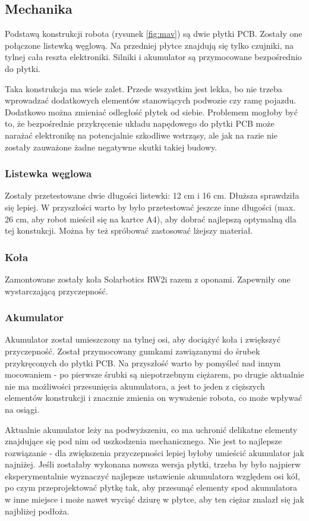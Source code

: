 \documentclass[12pt,a4paper]{article}
\begin{document}
\subsection{Mechanika}
Podstawą konstrukcji robota (rysunek \ref{fig:mav}) są dwie płytki PCB. 
Zostały one połączone listewką węglową. Na przedniej płytce znajdują się tylko czujniki, na tylnej cała reszta elektroniki. Silniki i akumulator są przymocowane bezpośrednio do płytki.

Taka konstrukcja ma wiele zalet. Przede wszystkim jest lekka, bo nie trzeba wprowadzać dodatkowych elementów stanowiących podwozie czy ramę pojazdu. Dodatkowo można zmieniać odległość płytek od siebie. Problemem mogłoby być to, że bezpośrednie przykręcenie układu napędowego do płytki PCB może narażać elektronikę na potencjalnie szkodliwe wstrząsy, ale jak na razie nie zostały zauważone żadne negatywne skutki takiej budowy.


\subsubsection{Listewka węglowa}
Zostały przetestowane dwie długości listewki: 12 cm i 16 cm. Dłuższa sprawdziła się lepiej. W przyszłości warto by było przetestować jeszcze inne długości (max. 26 cm, aby robot mieścił się na kartce A4), aby dobrać najlepszą optymalną dla tej konstukcji. Można by też spróbować zastosować lżejszy materiał.


\subsubsection{Koła}
Zamontowane zostały koła Solarbotics RW2i razem z oponami. Zapewniły one wystarczającą przyczepność.

\subsubsection{Akumulator}
Akumulator został umieszczony na tylnej osi, aby dociążyć koła i zwiększyć przyczepność. Został przymocowany gumkami zawiązanymi do śrubek przykręconych do płytki PCB. Na przyszłość warto by pomyśleć nad innym mocowaniem - po pierwsze śrubki są niepotrzebnym ciężarem, po drugie aktualnie nie ma możliwości przesunięcia akumulatora, a jest to jeden z cięższych elementów konstrukcji i znacznie zmienia on wyważenie robota, co może wpływać na osiągi.

Aktualnie akumulator leży na podwyższeniu, co ma uchronić delikatne elementy znajdujące się pod nim od uszkodzenia mechanicznego. Nie jest to najlepsze rozwiązanie - dla zwiększenia przyczepności lepiej byłoby umieścić akumulator jak najniżej. Jeśli zostałaby wykonana nowsza wersja płytki, trzeba by było najpierw eksperymentalnie wyznaczyć najlepsze ustawienie akumulatora względem osi kół, po czym przeprojektować płytkę tak, aby przesunąć elementy spod akumulatora w inne miejsce i może nawet wyciąć dziurę w płytce, aby ten ciężar znalazł się jak najbliżej podłoża.
\end{document}

